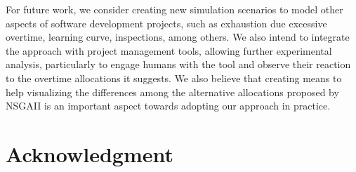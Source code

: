 \documentclass[conference]{IEEEtran}
\begin{document}
For future work, we consider creating new simulation scenarios to model other aspects of software development projects, such as exhaustion due excessive overtime, learning curve, inspections, among others. We also intend to integrate the approach with project management tools, allowing further experimental analysis, particularly to engage humans with the tool and observe their reaction to the overtime allocations it suggests. We also believe that creating means to help visualizing the differences among the alternative allocations proposed by NSGAII is an important aspect towards adopting our approach in practice.

\section{Acknowledgment}



\end{document}
